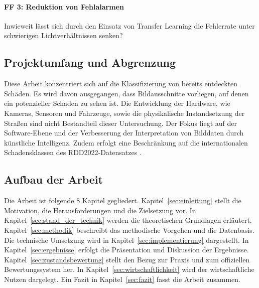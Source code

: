 \paragraph{FF 3: Reduktion von Fehlalarmen}
Inwieweit lässt sich durch den Einsatz von Transfer Learning die Fehlerrate unter schwierigen Lichtverhältnissen senken?

\subsection{Projektumfang und Abgrenzung}
\label{subsec:abgrenzung}

Diese Arbeit konzentriert sich auf die Klassifizierung von bereits entdeckten Schäden. Es wird davon ausgegangen, dass Bildausschnitte vorliegen, auf denen ein potenzieller Schaden zu sehen ist. 
Die Entwicklung der Hardware, wie Kameras, Sensoren und Fahrzeuge, sowie die physikalische Instandsetzung der Straßen sind nicht Bestandteil dieser Untersuchung. Der Fokus liegt auf der Software-Ebene und der Verbesserung der Interpretation von Bilddaten durch künstliche Intelligenz. Zudem erfolgt eine Beschränkung auf die internationalen Schadensklassen des RDD2022-Datensatzes \cite{rdd2022}.

\subsection{Aufbau der Arbeit}
\label{subsec:aufbau}

Die Arbeit ist folgende 8 Kapitel gegliedert. Kapitel~\ref{sec:einleitung} stellt die Motivation, die Herausforderungen und die Zielsetzung vor. 
In Kapitel~\ref{sec:stand_der_technik} werden die theoretischen Grundlagen erläutert. 
Kapitel~\ref{sec:methodik} beschreibt das methodische Vorgehen und die Datenbasis. 
Die technische Umsetzung wird in Kapitel~\ref{sec:implementierung} dargestellt. 
In Kapitel~\ref{sec:ergebnisse} erfolgt die Präsentation und Diskussion der Ergebnisse. 
Kapitel~\ref{sec:zustandsbewertung} stellt den Bezug zur Praxis und zum offiziellen Bewertungssystem her. 
In Kapitel~\ref{sec:wirtschaftlichkeit} wird der wirtschaftliche Nutzen dargelegt. 
Ein Fazit in Kapitel~\ref{sec:fazit} fasst die Arbeit zusammen.
